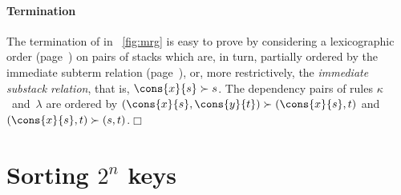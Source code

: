 \paragraph{Termination}
\label{merging_termination}

The termination of  in
\fig~\vref{fig:mrg} is easy to prove by considering a lexicographic
order
(page~\pageref{par:ackermann}) on pairs of stacks which are, in turn,
partially ordered by the immediate subterm
relation
(page~\pageref{par:well-founded}), or, more restrictively, the
\emph{immediate substack relation}, that is, \(\cons{x}{s} \succ s\). The dependency
pairs of rules
\(\kappa\)~and~\(\lambda\) are ordered by \((\cons{x}{s},\cons{y}{t})
\succ (\cons{x}{s},t)\) and \((\cons{x}{s},t) \succ
(s,t)\).\hfill\(\Box\)

\section{Sorting $2^n$ keys}
\label{sec:power_of_two}

